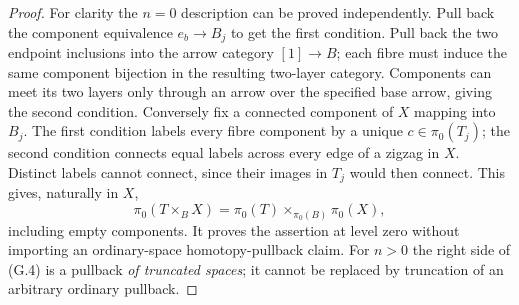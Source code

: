\begin{proof}
For clarity the $n=0$ description can be proved independently. Pull back
the component equivalence $e_b\to B_j$ to get the first condition.
Pull back the two endpoint inclusions into the arrow category
$[1]\to B$; each fibre must induce the same component bijection in
the resulting two-layer category. Components can meet its two layers
only through an arrow over the specified base arrow, giving the second
condition. Conversely fix a connected component of $X$ mapping into
$B_j$. The first condition labels every fibre component by a unique
$c\in\pi_0(T_j)$; the second condition connects equal labels across
every edge of a zigzag in $X$. Distinct labels cannot connect, since
their images in $T_j$ would then connect. This gives, naturally in $X$,
\[
 \pi_0(T\times_BX)=\pi_0(T)\times_{\pi_0(B)}\pi_0(X),
\]
including empty components. It proves the assertion at level zero
without importing an ordinary-space homotopy-pullback claim. For
$n>0$ the right side of (G.4) is a pullback \emph{of truncated spaces};
it cannot be replaced by truncation of an arbitrary ordinary pullback.
\end{proof}

